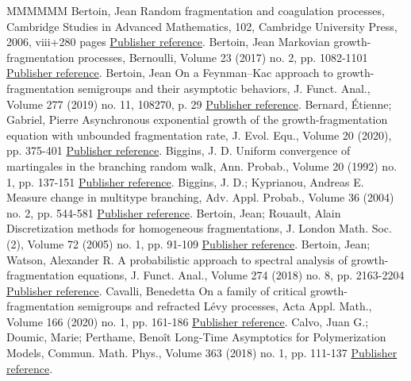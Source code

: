 \begin{thebibliography}{MMMMMM}
 Bertoin, Jean Random fragmentation and coagulation processes, Cambridge Studies in Advanced Mathematics, 102, Cambridge University Press, 2006, viii+280 pages \href{https://ahl.centre-mersenne.org/item/AHL_2020__3__795_0/#Ber-frag}{Publisher reference}.
 Bertoin, Jean Markovian growth-fragmentation processes, Bernoulli, Volume 23 (2017) no. 2, pp. 1082-1101 \href{https://ahl.centre-mersenne.org/item/AHL_2020__3__795_0/#BeGF}{Publisher reference}.
 Bertoin, Jean On a Feynman–Kac approach to growth-fragmentation semigroups and their asymptotic behaviors, J. Funct. Anal., Volume 277 (2019) no. 11, 108270, p. 29 \href{https://ahl.centre-mersenne.org/item/AHL_2020__3__795_0/#BeFK}{Publisher reference}.
 Bernard, Étienne; Gabriel, Pierre Asynchronous exponential growth of the growth-fragmentation equation with unbounded fragmentation rate, J. Evol. Equ., Volume 20 (2020), pp. 375-401 \href{https://ahl.centre-mersenne.org/item/AHL_2020__3__795_0/#BerGab2}{Publisher reference}.
 Biggins, J. D. Uniform convergence of martingales in the branching random walk, Ann. Probab., Volume 20 (1992) no. 1, pp. 137-151 \href{https://ahl.centre-mersenne.org/item/AHL_2020__3__795_0/#Biggins92}{Publisher reference}.
 Biggins, J. D.; Kyprianou, Andreas E. Measure change in multitype branching, Adv. Appl. Probab., Volume 36 (2004) no. 2, pp. 544-581 \href{https://ahl.centre-mersenne.org/item/AHL_2020__3__795_0/#BigKyp}{Publisher reference}.
 Bertoin, Jean; Rouault, Alain Discretization methods for homogeneous fragmentations, J. London Math. Soc. (2), Volume 72 (2005) no. 1, pp. 91-109 \href{https://ahl.centre-mersenne.org/item/AHL_2020__3__795_0/#BeRou}{Publisher reference}.
 Bertoin, Jean; Watson, Alexander R. A probabilistic approach to spectral analysis of growth-fragmentation equations, J. Funct. Anal., Volume 274 (2018) no. 8, pp. 2163-2204 \href{https://ahl.centre-mersenne.org/item/AHL_2020__3__795_0/#BW}{Publisher reference}.
 Cavalli, Benedetta On a family of critical growth-fragmentation semigroups and refracted Lévy processes, Acta Appl. Math., Volume 166 (2020) no. 1, pp. 161-186 \href{https://ahl.centre-mersenne.org/item/AHL_2020__3__795_0/#Cavalli}{Publisher reference}.
 Calvo, Juan G.; Doumic, Marie; Perthame, Benoît Long-Time Asymptotics for Polymerization Models, Commun. Math. Phys., Volume 363 (2018) no. 1, pp. 111-137 \href{https://ahl.centre-mersenne.org/item/AHL_2020__3__795_0/#CalvoDoumicPerthame}{Publisher reference}.

\end{thebibliography}
